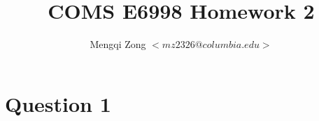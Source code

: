 \documentclass[12pt]{article}
\title{COMS E6998 Homework 2}
\author{Mengqi Zong $<mz2326@columbia.edu>$}
\begin{document}
\maketitle

\setlength{\parindent}{0in}

\section*{Question 1}
\end{document}
